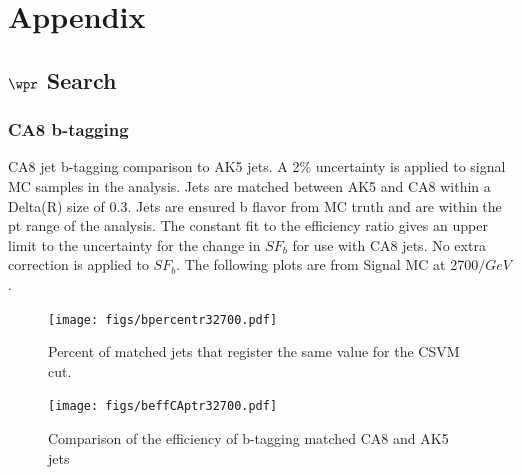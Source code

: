 \chapter{Appendix}
\label{sec:appendix}
\section{$\wpr$ Search}
\subsection{CA8 b-tagging}
\label{sec:ca8toak5}


CA8 jet b-tagging comparison to AK5 jets. A 2\% uncertainty is applied to signal MC samples in the analysis.  Jets are matched between AK5 and CA8 
within a Delta(R) size of 0.3.
Jets are ensured b flavor from MC truth and are within the pt range of the analysis.  The constant fit to the efficiency ratio gives an upper limit to the uncertainty 
for the change in $SF_b$ for use with CA8 jets.  No extra correction is applied to $SF_b$.  The following plots are from Signal MC at 2700$/GeV$. 

\begin{figure}[Htcb]
\centering
\texttt{[image: figs/bpercentr32700.pdf]}
\caption{Percent of matched jets that register the same value for the CSVM cut.}
\label{figs:bpercent}
\end{figure}

\begin{figure}[Htcb]
\centering
\texttt{[image: figs/beffCAptr32700.pdf]}
\caption{Comparison of the efficiency of b-tagging matched CA8 and AK5 jets}
\label{figs:beff}
\end{figure}

